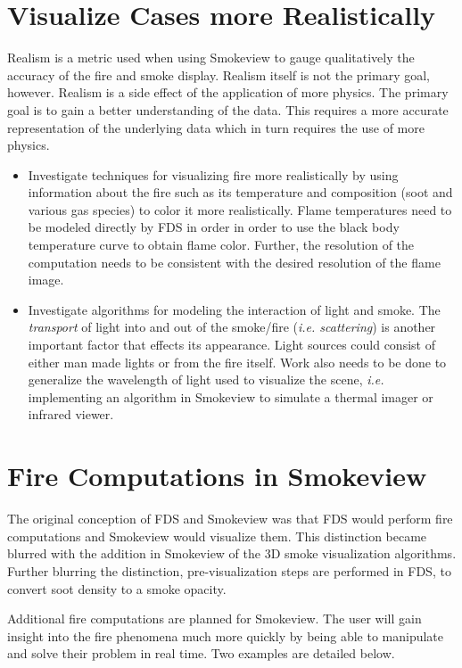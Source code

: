 \documentclass[11pt,twoside]{book}
\begin{document}
\section{Visualize Cases more Realistically}
Realism is a metric used when using Smokeview to gauge qualitatively the accuracy of the fire and smoke display. Realism itself is not the primary goal, however.  Realism is a side effect of the application of more physics.
The primary goal is to gain a better understanding of the data.  This requires a more accurate representation of the underlying data which in turn requires the use of more physics.
\begin{itemize}
\item Investigate techniques for visualizing fire more realistically by using information about the fire such as its temperature and composition (soot and various gas species) to color it more realistically.  Flame temperatures need to be modeled directly by FDS in order in order to use the black body temperature curve to obtain flame color.  Further, the resolution of the computation needs to be consistent with the desired resolution of the flame image.

\item Investigate algorithms for modeling the interaction of light and smoke.
The {\em transport} of light into and out of the smoke/fire ({\em i.e. scattering}) is another important factor that effects its appearance.  Light sources could consist of either man made lights or from the fire itself.  Work also needs to be done to generalize the wavelength of light used to visualize the scene, {\em i.e.} implementing an algorithm in Smokeview to simulate a thermal imager or infrared viewer.
\end{itemize}

\section{Fire Computations in Smokeview}
The original conception of FDS and Smokeview was that FDS would perform fire computations and Smokeview would visualize them.
This distinction became blurred with the addition in Smokeview of the 3D smoke visualization algorithms.
Further blurring the distinction, pre-visualization steps are performed in FDS, to convert soot density to a smoke opacity.

Additional fire computations are planned for Smokeview.  The user will gain insight into the fire phenomena much more quickly by being able to manipulate and solve their problem in real time.  Two examples are detailed below.
\end{document}
